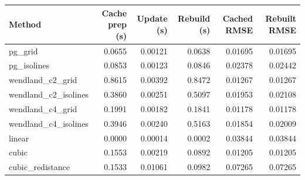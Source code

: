 \begin{tabular}{lrrrrr}\toprule
Method & Cache prep (s) & Update (s) & Rebuild (s) & Cached RMSE & Rebuilt RMSE \\ \midrule
pg\_grid & 0.0655 & 0.00121 & 0.0638 & 0.01695 & 0.01695 \\
pg\_isolines & 0.0853 & 0.00123 & 0.0846 & 0.02378 & 0.02442 \\
wendland\_c2\_grid & 0.8615 & 0.00392 & 0.8472 & 0.01267 & 0.01267 \\
wendland\_c2\_isolines & 0.3860 & 0.00251 & 0.5097 & 0.01953 & 0.02108 \\
wendland\_c4\_grid & 0.1991 & 0.00182 & 0.1841 & 0.01178 & 0.01178 \\
wendland\_c4\_isolines & 0.3946 & 0.00240 & 0.5163 & 0.01854 & 0.02009 \\
linear & 0.0000 & 0.00014 & 0.0002 & 0.03844 & 0.03844 \\
cubic & 0.1553 & 0.00219 & 0.0892 & 0.01205 & 0.01205 \\
cubic\_redistance & 0.1533 & 0.01061 & 0.0982 & 0.07265 & 0.07265 \\
\bottomrule\end{tabular}

